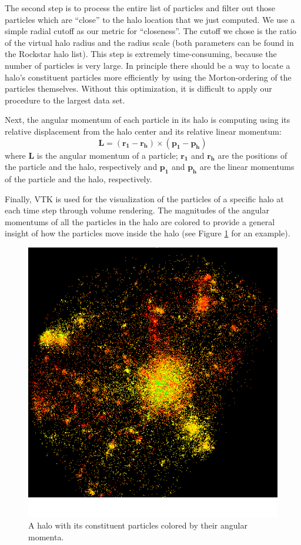\documentclass[12pt]{article}
\renewcommand{\vec}[1]{\mathbf{#1}}
\begin{document}
The second step is to process the entire list of particles and filter out those
particles which are ``close'' to the halo location that we just computed.  We
use a simple radial cutoff as our metric for ``closeness''. The cutoff we chose
is the ratio of the virtual halo radius and the radius scale (both parameters
can be found in the Rockstar halo list). This step is extremely time-consuming,
because the number of particles is very large.  In principle there should be
a way to locate a halo's constituent particles more efficiently by using the
Morton-ordering of the particles themselves. Without this optimization, it is
difficult to apply our procedure to the largest data set.

Next, the angular momentum of each particle in its halo is computing using
its relative displacement from the halo center and its relative linear
momentum:
\begin{equation}
\vec{L} = (\vec{r_1} - \vec{r_h}) \times (\vec{p_1} - \vec{p_h})
\end{equation}
where $\vec{L}$ is the angular momentum of a particle; $\vec{r_1}$ and $\vec{r_h}$ are
the positions of the particle and the halo, respectively and $\vec{p_1}$ and $\vec{p_h}$ 
are the linear momentums of the particle and the halo, respectively.

Finally, VTK is used for the visualization of the particles of a specific halo
at each time step through volume rendering. The magnitudes of the angular
momentums of all the particles in the halo are colored to provide a general
insight of how the particles move inside the halo (see Figure
\ref{fig:halo_particles} for an example).

\begin{figure}[htp]
\centering
\includegraphics[width=0.5\columnwidth]{../figures/halo_particles.png}
\caption{A halo with its constituent particles colored by their angular momenta.}
\label{fig:halo_particles}
\end{figure}
\end{document}
